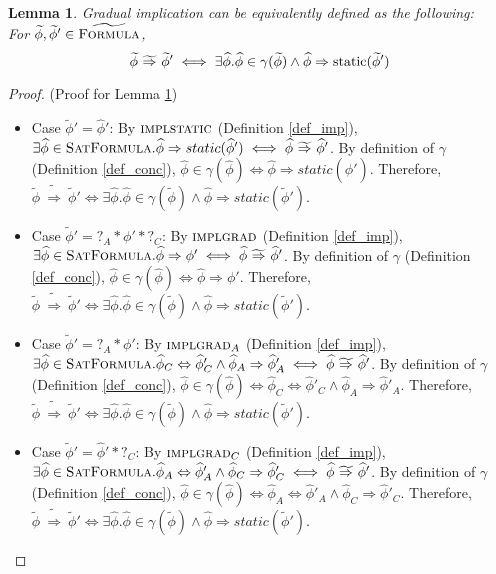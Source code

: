 \documentclass {article}
\newtheorem{lemma}[theorem]{Lemma}
\newcommand{\fphi}{\widehat{\phi}}
\newcommand{\tphi}{\widetilde{\phi}}
\newcommand{\imp}{\Rightarrow}
\newcommand{\timp}{\ \widetilde{\Rightarrow}\ }
\newcommand{\static}[1]{\textup{static}(#1)}
\newcommand{\satdef}{\textsc{SatFormula}}
\newcommand{\gradformula}{\widetilde{\textsc{Formula}}}
\begin{document}
\begin{lemma}
\label{lemma_impl_equiv}
Gradual implication can be equivalently defined as the following:\\ For $\tphi, \tphi' \in \gradformula$, $$\tphi \timp \tphi' \iff \exists \fphi. \fphi \in \gamma(\tphi) \wedge \fphi \imp \static{\tphi'}$$
\end{lemma}
\begin{proof}(Proof for Lemma \ref{lemma_impl_equiv})\\
\begin{itemize}
	\item Case $\tphi' = \fphi'$: By $\textsc{implstatic}$ (Definition \ref{def_imp}), $\exists \fphi \in \satdef.\fphi \imp static(\fphi') \iff \fphi \timp \fphi'$. By definition of $\gamma$ (Definition \ref{def_conc}), $\fphi \in \gamma(\fphi) \iff \fphi \imp static(\fphi')$. Therefore, $\tphi \timp \tphi' \iff \exists \fphi. \fphi \in \gamma(\tphi) \wedge \fphi \imp static(\tphi')$.

	\item Case $\tphi' = ?_A \ast \phi' \ast ?_C$: By $\textsc{implgrad}$ (Definition \ref{def_imp}), $\exists \fphi \in \satdef.\fphi\Rightarrow \phi' \iff \fphi \timp \fphi'$. By definition of $\gamma$ (Definition \ref{def_conc}), $\fphi \in \gamma(\fphi) \iff \fphi\Rightarrow \phi'$. Therefore, $\tphi \timp \tphi' \iff \exists \fphi. \fphi \in \gamma(\tphi) \wedge \fphi \imp static(\tphi')$.


	\item Case $\tphi' = ?_A \ast \phi'$: By $\textsc{implgrad}_A$ (Definition \ref{def_imp}), $\exists \fphi \in \satdef.\fphi_C \Leftrightarrow \fphi'_C \wedge \fphi_A \Rightarrow \fphi'_A \iff \fphi \timp \fphi'$. By definition of $\gamma$ (Definition \ref{def_conc}), $\fphi \in \gamma(\fphi) \iff \fphi_C \Leftrightarrow \fphi'_C \wedge \fphi_A \Rightarrow \fphi'_A$. Therefore, $\tphi \timp \tphi' \iff \exists \fphi. \fphi \in \gamma(\tphi) \wedge \fphi \imp static(\tphi')$.

	\item Case $\tphi' = \fphi' \ast ?_C$: By $\textsc{implgrad}_C$ (Definition \ref{def_imp}), $\exists \fphi \in \satdef.\fphi_A \Leftrightarrow \fphi'_A \wedge \fphi_C \Rightarrow \fphi'_C \iff \fphi \timp \fphi'$. By definition of $\gamma$ (Definition \ref{def_conc}), $\fphi \in \gamma(\fphi) \iff \fphi_A \Leftrightarrow \fphi'_A \wedge \fphi_C \Rightarrow \fphi'_C$. Therefore, $\tphi \timp \tphi' \iff \exists \fphi. \fphi \in \gamma(\tphi) \wedge \fphi \imp static(\tphi')$.



\end{itemize}
\end{proof}
\end{document}
